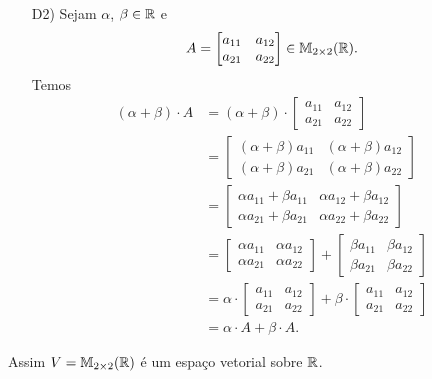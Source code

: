 \documentclass[12pt]{exam}
\begin{document}
\begin{itemize}
        \item[D2)] Sejam $\alpha$, $\beta \in \mathbb{R}$ e
        \[
        A = \begin{bmatrix} a_{11} & a_{12}\\a_{21} & a_{22}\end{bmatrix} \in \mathbb{M}_{2 \times 2}(\mathbb{R}).
        \]
        Temos
        \begin{align*}
            (\alpha + \beta)\cdot A & = (\alpha + \beta)\cdot\begin{bmatrix} a_{11} & a_{12}\\a_{21} & a_{22}\end{bmatrix}
            \\ &= \begin{bmatrix} (\alpha + \beta)a_{11} & (\alpha + \beta)a_{12}\\(\alpha + \beta)a_{21} & (\alpha + \beta)a_{22}\end{bmatrix}
            \\ &= \begin{bmatrix} \alpha a_{11} + \beta a_{11} & \alpha a_{12} + \beta a_{12}\\\alpha a_{21} + \beta a_{21} & \alpha a_{22} + \beta a_{22}\end{bmatrix}
            \\ &= \begin{bmatrix} \alpha a_{11} & \alpha a_{12}\\ \alpha a_{21} & \alpha a_{22}\end{bmatrix}
            + \begin{bmatrix} \beta a_{11} & \beta a_{12}\\ \beta a_{21} & \beta a_{22}\end{bmatrix}
            \\ &= \alpha\cdot\begin{bmatrix} a_{11} & a_{12}\\a_{21} & a_{22}\end{bmatrix}  + \beta\cdot\begin{bmatrix} a_{11} & a_{12}\\a_{21} & a_{22}\end{bmatrix}
            \\ &= \alpha\cdot A + \beta\cdot A.
        \end{align*}
    \end{itemize}
    Assim $V = \mathbb{M}_{2 \times 2}(\mathbb{R})$ é um espaço vetorial sobre $\mathbb{R}$.
\end{document}
